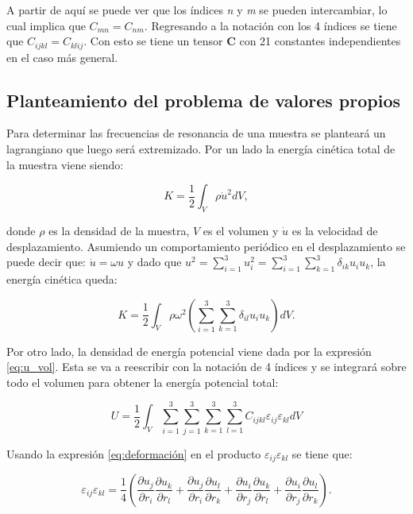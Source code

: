 \documentclass[12pt]{article}
\begin{document}
A partir de aquí se puede ver que los índices \textit{n} y \textit{m} se pueden intercambiar, lo cual implica que $C_{mn} = C_{nm}$. Regresando a la notación con los 4 índices se tiene que $C_{ijkl} = C_{klij}$. Con esto se tiene un tensor $\bm{C}$ con 21 constantes independientes en el caso más general. 


\subsection{Planteamiento del problema de valores propios}

Para determinar las frecuencias de resonancia de una muestra se planteará un lagrangiano que luego será extremizado. Por un lado la energía cinética total de la muestra viene siendo:

\begin{equation}
	K = \frac{1}{2} \int_{V}{\rho \dot{u}^2} dV,
\end{equation}

donde $\rho$ es la densidad de la muestra, $V$ es el volumen y $\dot{u}$ es la velocidad de desplazamiento. Asumiendo un comportamiento periódico en el desplazamiento se puede decir que: $\dot{u} = \omega{u}$ y dado que $u^2 = \sum_{i=1}^{3}{u_i^2} = \sum_{i=1}^{3}{\sum_{k=1}^{3}{\delta_{ik}u_i u_k}}$, la energía cinética queda:

\begin{equation}
	K = \frac{1}{2} \int_{V}{\rho \omega^2 \left(\sum_{i=1}^{3}{\sum_{k=1}^{3}{\delta_{il} u_i u_k}} \right) dV}.
	\label{eq:K}
\end{equation}

Por otro lado, la densidad de energía potencial viene dada por la expresión \ref{eq:u_vol}. Esta se va a reescribir con la notación de 4 índices y se integrará sobre todo el volumen para obtener la energía potencial total: 

\begin{equation}
	U = \frac{1}{2} \int_{V}{\sum_{i=1}^{3}\sum_{j=1}^{3}\sum_{k=1}^{3}\sum_{l=1}^{3}{C_{ijkl}\varepsilon_{ij}\varepsilon_{kl}}dV}
	\label{eq:U_raw}
\end{equation}

Usando la expresión \ref{eq:deformación} en el producto $\varepsilon_{ij}\varepsilon_{kl}$ se tiene que:

\begin{equation}
	\varepsilon_{ij}\varepsilon_{kl} = \frac{1}{4} \left(\frac{\partial u_j}{\partial r_i} \frac{\partial u_k}{\partial r_l} + \frac{\partial u_j}{\partial r_i} \frac{\partial u_l}{\partial r_k}+\frac{\partial u_i}{\partial r_j} \frac{\partial u_k}{\partial r_l}+\frac{\partial u_i}{\partial r_j} \frac{\partial u_l}{\partial r_k} \right).
\end{equation}
\end{document}
